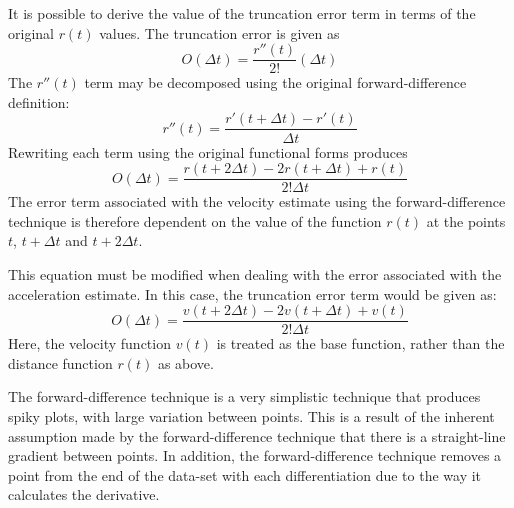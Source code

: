 It is possible to derive the value of the truncation error term in terms of the original $r(t)$ values. The truncation error is given as
\begin{equation}
O(\Delta t) = \frac{r''(t)}{2!}(\Delta t)
\end{equation}
The $r''(t)$ term may be decomposed using the original forward-difference definition:
\begin{equation}
r''(t) = \frac{r'(t + \Delta t) - r'(t)}{\Delta t}
\end{equation}
Rewriting each term using the original functional forms produces
\begin{equation}
O(\Delta t) = \frac{r(t + 2\Delta t) - 2r(t + \Delta t) + r(t)}{2!\Delta t}
\end{equation}
The error term associated with the velocity estimate using the forward-difference technique is therefore dependent on the value of the function $r(t)$ at the points $t$, $t+\Delta t$ and $t+2\Delta t$.

This equation must be modified when dealing with the error associated with the acceleration estimate. In this case, the truncation error term would be given as:
\begin{equation}
O(\Delta t) = \frac{v(t + 2\Delta t) - 2v(t + \Delta t) + v(t)}{2!\Delta t}
\end{equation}
Here, the velocity function $v(t)$ is treated as the base function, rather than the distance function $r(t)$ as above. 

The forward-difference technique is a very simplistic technique that produces spiky plots, with large variation between points. This is a result of the inherent assumption made by the forward-difference technique that there is a straight-line gradient between points. In addition, the forward-difference technique removes a point from the end of the data-set with each differentiation due to the way it calculates the derivative.